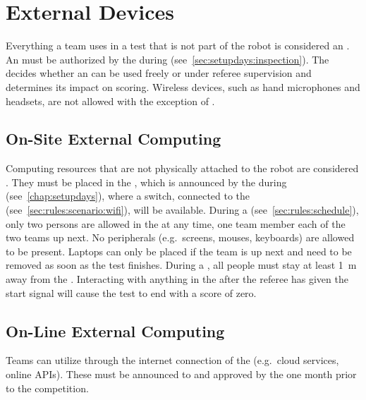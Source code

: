 %
%
\section{External Devices}
\label{sec:rules:externaldevices}
Everything a team uses in a test that is not part of the robot is considered an \ExternalDevice{}.
An \ExternalDevice{} must be authorized by the \TC{} during \RobotInspection{} (see~\ref{sec:setupdays:inspection}).
The  decides whether an \ExternalDevice{} can be used freely or under referee supervision and determines its impact on scoring.
Wireless devices, such as hand microphones and headsets, are not allowed with the exception of \ExternalComputing{}. 

\subsection{On-Site External Computing}
\label{sec:rules:onsiteexternalcomputing}
Computing resources that are not physically attached to the robot are considered \ExternalComputing{}.
They must be placed in the \ECRA{}, which is announced by the \TC{} during \SetupDays{} (see~\ref{chap:setupdays}), where a switch, connected to the \ArenaNetwork{} (see~\ref{sec:rules:scenario:wifi}), will be available.
During a \Testblock{} (see~\ref{sec:rules:schedule}), only two persons are allowed in the  at any time, one team member each of the two teams up next. No peripherals (e.g.~screens, mouses, keyboards) are allowed to be present. Laptops can only be placed if the team is up next and need to be removed as soon as the test finishes.
During a \Testslot{}, all people must stay at least \SI{1}{\meter} away from the .
Interacting with anything in the  after the referee has given the start signal will cause the test to end with a score of zero.


\subsection{On-Line External Computing}
\label{sec:rules:onlineexternalcomputing}
Teams can utilize \ExternalComputing{} through the internet connection of the \ArenaNetwork{} (e.g.~cloud services, online APIs). These must be announced to and approved by the \TC{} one month prior to the competition.

